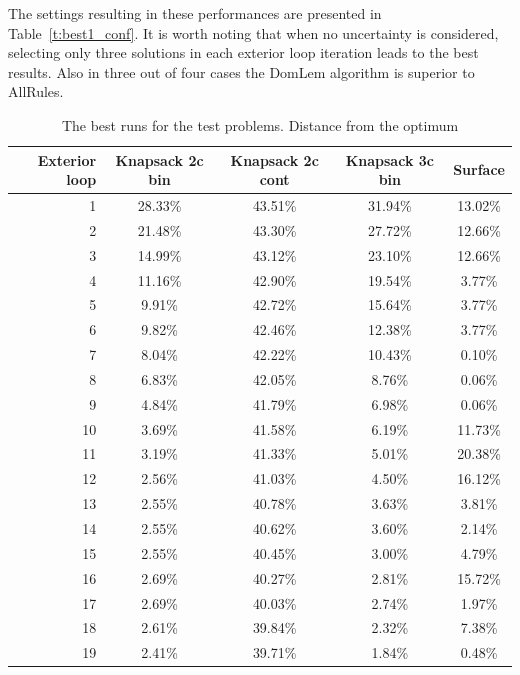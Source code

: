 The settings resulting in these performances are presented in
Table~\ref{t:best1_conf}. It is worth noting that when no uncertainty is
considered, selecting only three solutions in each exterior loop iteration
leads to the best results. Also in three out of four cases the DomLem
algorithm is superior to AllRules.

\begin{table}[h]
  \centering
  \begin{tabular}{r c c c c}
    \hline
    Exterior loop & Knapsack 2c bin & Knapsack 2c cont & Knapsack 3c bin & Surface \\
    \hline
    1 & 28.33\% & 43.51\% & 31.94\% & 13.02\% \\
    2 & 21.48\% & 43.30\% & 27.72\% & 12.66\% \\
    3 & 14.99\% & 43.12\% & 23.10\% & 12.66\% \\
    4 & 11.16\% & 42.90\% & 19.54\% & 3.77\% \\
    5 & 9.91\% & 42.72\% & 15.64\% & 3.77\% \\
    6 & 9.82\% & 42.46\% & 12.38\% & 3.77\% \\
    7 & 8.04\% & 42.22\% & 10.43\% & 0.10\% \\
    8 & 6.83\% & 42.05\% & 8.76\% & 0.06\% \\
    9 & 4.84\% & 41.79\% & 6.98\% & 0.06\% \\
    10 & 3.69\% & 41.58\% & 6.19\% & 11.73\% \\
    11 & 3.19\% & 41.33\% & 5.01\% & 20.38\% \\
    12 & 2.56\% & 41.03\% & 4.50\% & 16.12\% \\
    13 & 2.55\% & 40.78\% & 3.63\% & 3.81\% \\
    14 & 2.55\% & 40.62\% & 3.60\% & 2.14\% \\
    15 & 2.55\% & 40.45\% & 3.00\% & 4.79\% \\
    16 & 2.69\% & 40.27\% & 2.81\% & 15.72\% \\
    17 & 2.69\% & 40.03\% & 2.74\% & 1.97\% \\
    18 & 2.61\% & 39.84\% & 2.32\% & 7.38\% \\
    19 & 2.41\% & 39.71\% & 1.84\% & 0.48\% \\
    \hline
  \end{tabular}
  \caption{The best runs for the test problems. Distance from the optimum}
  \label{t:best1}
\end{table} 


